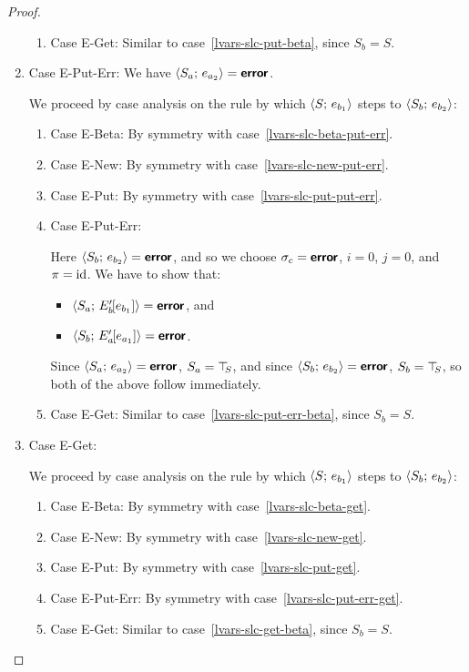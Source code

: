 \begin{proof}
\begin{enumerate}
\begin{enumerate}
    \item \label{lvars-slc-put-get}Case {\sc E-Get}: Similar to
      case~\ref{lvars-slc-put-beta}, since $S_b = S$.
    \end{enumerate}
  \item Case {\sc E-Put-Err}: We have $\langle S_a;\, e_{a_2} \rangle =
    \textbf{\textsf{error}}$.

    We proceed by case analysis on the rule by which
    $\langle S;\, e_{b_1} \rangle$ steps to $\langle S_b;\, e_{b_2} \rangle$:
    \begin{enumerate}
    \item \label{lvars-slc-put-err-beta}Case {\sc E-Beta}: By symmetry with case~\ref{lvars-slc-beta-put-err}.
    \item \label{lvars-slc-put-err-new}Case {\sc E-New}: By symmetry with case~\ref{lvars-slc-new-put-err}.
    \item \label{lvars-slc-put-err-put}Case {\sc E-Put}: By symmetry with case~\ref{lvars-slc-put-put-err}.
    \item \label{lvars-slc-put-err-put-err}Case {\sc E-Put-Err}: 

      Here $\langle S_b;\, e_{b_2} \rangle = \textbf{\textsf{error}}$, and so we choose $\sigma_c
      = \textbf{\textsf{error}}$, $i = 0$, $j = 0$, and $\pi = \mathrm{id}$.  We have to show
      that:
      \begin{itemize}
      \item $\langle S_a;\, E'_b\hspace{-1mm}\left[e_{b_1}\right] \rangle = \textbf{\textsf{error}}$, and
      \item
        $\langle S_b;\, E'_a\hspace{-1mm}\left[e_{a_1}\right] \rangle = \textbf{\textsf{error}}$.
      \end{itemize}

      Since $\langle S_a;\, e_{a_2} \rangle = \textbf{\textsf{error}}$, $S_a = \top\hspace{-0.85mm}_{S}$, and since
      $\langle S_b;\, e_{b_2} \rangle = \textbf{\textsf{error}}$, $S_b = \top\hspace{-0.85mm}_{S}$, so both of the
      above follow immediately.

    \item \label{lvars-slc-put-err-get}Case {\sc E-Get}: Similar to
      case~\ref{lvars-slc-put-err-beta}, since $S_b = S$.
    \end{enumerate}
  \item Case {\sc E-Get}:

    We proceed by case analysis on the rule by which
    $\langle S;\, e_{b_1} \rangle$ steps to $\langle S_b;\, e_{b_2} \rangle$:
    \begin{enumerate}
    \item \label{lvars-slc-get-beta}Case {\sc E-Beta}: By symmetry with case~\ref{lvars-slc-beta-get}.
    \item \label{lvars-slc-get-new}Case {\sc E-New}: By symmetry with case~\ref{lvars-slc-new-get}.
    \item \label{lvars-slc-get-put}Case {\sc E-Put}: By symmetry with case~\ref{lvars-slc-put-get}.
    \item \label{lvars-slc-get-put-err}Case {\sc E-Put-Err}: By symmetry with case~\ref{lvars-slc-put-err-get}.
    \item \label{lvars-slc-get-get}Case {\sc E-Get}: Similar to
      case~\ref{lvars-slc-get-beta}, since $S_b = S$.
    \end{enumerate}
  \end{enumerate}
\end{proof}
